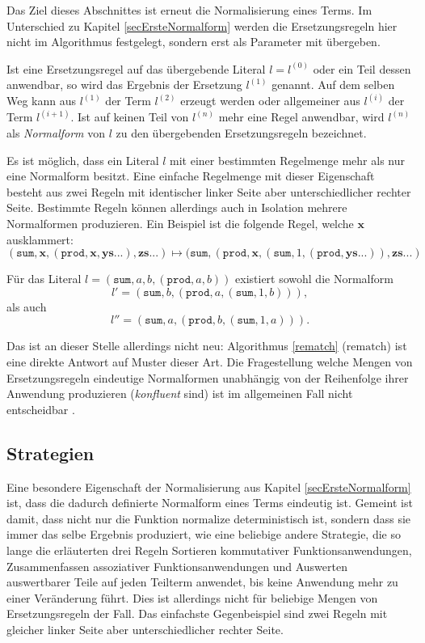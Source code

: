 Das Ziel dieses Abschnittes ist erneut die Normalisierung eines Terms. Im Unterschied zu Kapitel \ref{secErsteNormalform} werden die Ersetzungsregeln hier nicht im Algorithmus festgelegt, sondern erst als Parameter mit übergeben. 

Ist eine Ersetzungsregel auf das übergebende Literal $l = l^{(0)}$ oder ein Teil dessen anwendbar, so wird das Ergebnis der Ersetzung $l^{(1)}$ genannt. Auf dem selben Weg kann aus $l^{(1)}$ der Term $l^{(2)}$ erzeugt werden oder allgemeiner aus $l^{(i)}$ der Term $l^{(i+1)}$. Ist auf keinen Teil von $l^{(n)}$ mehr eine Regel anwendbar, wird $l^{(n)}$ als \emph{Normalform} von $l$ zu den übergebenden Ersetzungsregeln bezeichnet. 

Es ist möglich, dass ein Literal $l$ mit einer bestimmten Regelmenge mehr als nur eine Normalform besitzt. Eine einfache Regelmenge mit dieser Eigenschaft besteht aus zwei Regeln mit identischer linker Seite aber unterschiedlicher rechter Seite. Bestimmte Regeln können allerdings auch in Isolation mehrere Normalformen produzieren. Ein Beispiel ist die folgende Regel, welche $\mathbf x$ ausklammert:
$$(\texttt{sum}, \mathbf x, (\texttt{prod}, \mathbf x, \mathbf{ys...}), \mathbf{zs...}) 
\mapsto (\texttt{sum}, (\texttt{prod}, \mathbf x, (\texttt{sum}, 1, (\texttt{prod}, \mathbf{ys...})) , \mathbf{zs...})$$

Für das Literal $l = (\texttt{sum}, a, b, (\texttt{prod}, a, b))$ existiert sowohl die Normalform 
$$l' = (\texttt{sum}, b, (\texttt{prod}, a, (\texttt{sum}, 1, b))),$$ 
als auch 
$$l'' = (\texttt{sum}, a, (\texttt{prod}, b, (\texttt{sum}, 1, a))).$$

Das ist an dieser Stelle allerdings nicht neu: Algorithmus \ref{rematch} ($\mathrm{rematch}$) ist eine direkte Antwort auf Muster dieser Art. Die Fragestellung welche Mengen von Ersetzungsregeln eindeutige Normalformen unabhängig von der Reihenfolge ihrer Anwendung produzieren (\emph{konfluent} sind) ist im allgemeinen Fall nicht entscheidbar \cite{KonfluenzUnentscheidbar}.



\subsection{Strategien}
Eine besondere Eigenschaft der Normalisierung aus Kapitel \ref{secErsteNormalform} ist, dass die dadurch definierte Normalform eines Terms eindeutig ist. Gemeint ist damit, dass nicht nur die Funktion $\mathrm{normalize}$ deterministisch ist, sondern dass sie immer das selbe Ergebnis produziert, wie eine beliebige andere Strategie, die so lange die erläuterten drei Regeln Sortieren kommutativer Funktionsanwendungen, Zusammenfassen assoziativer Funktionsanwendungen und Auswerten auswertbarer Teile auf jeden Teilterm anwendet, bis keine Anwendung mehr zu einer Veränderung führt. Dies ist allerdings nicht für beliebige Mengen von Ersetzungsregeln der Fall. Das einfachste Gegenbeispiel sind zwei Regeln mit gleicher linker Seite aber unterschiedlicher rechter Seite.




